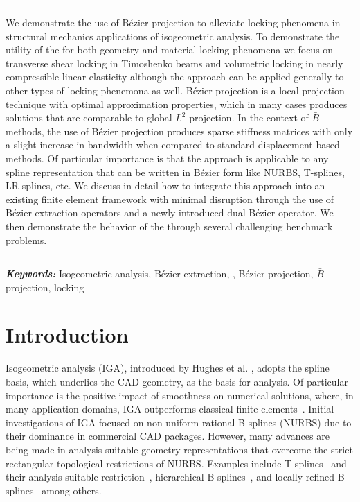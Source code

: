 \documentclass{article}
\newcommand{\Bezier}{{B\'{e}zier} }
\renewenvironment{abstract}{%
\hfill\begin{minipage}{0.95\textwidth}
\rule{\textwidth}{1pt}}
{\par\noindent\rule{\textwidth}{1pt}\end{minipage}}
\providecommand{\keywords}[1]{\textbf{\textit{Keywords: }}#1}
\begin{document}
\begin{abstract}
  We demonstrate the use of B\'{e}zier projection to alleviate locking phenomena in structural mechanics applications of isogeometric analysis.  To demonstrate the utility of the \replaced{\Bezier projection}{approach} for both geometry and material locking phenomena we focus on transverse shear locking in Timoshenko beams and volumetric locking in nearly compressible linear elasticity although the approach can be applied generally to other types of locking phenemona as well. B\'{e}zier projection is a local projection technique with optimal approximation properties, which in many cases produces solutions that are comparable to global $L^2$ projection. In the context of $\bar{B}$ methods, the use of B\'ezier projection produces sparse stiffness matrices with only a slight increase in bandwidth when compared to standard displacement-based methods. Of particular importance is that the approach is applicable to any spline representation that can be written in B\'ezier form like NURBS, T-splines, LR-splines, etc. We discuss in detail how to integrate this approach into an existing finite element framework with minimal disruption through the use of B\'ezier extraction operators and a newly introduced dual  \Bezier {} operator. We then demonstrate the behavior of the  through several challenging benchmark problems.
\end{abstract}
\keywords{Isogeometric analysis, B\'ezier extraction, \added{\Bezier dual basis}, B\'ezier projection, $\bar{B}$-projection, locking}
\section{Introduction}
Isogeometric analysis (IGA), introduced by Hughes et al. \cite{hughes_isogeometric_2005}, adopts the spline basis, which underlies the CAD geometry, as the basis for analysis. Of particular importance is the positive impact of smoothness on numerical solutions, where, in many application domains, IGA outperforms classical finite elements~\cite{cottrell_isogeometric_2009,cottrell_studies_2007,cottrell2006isogeometric,hughes_duality_2008,bazilevs_isogeometric_2010,evans_n-widths_2009}. Initial investigations of IGA focused on non-uniform rational B-splines (NURBS) due to their dominance in commercial CAD packages. However, many advances are being made in analysis-suitable geometry representations that overcome the strict rectangular topological restrictions of NURBS. Examples include T-splines~\cite{bazilevs_isogeometric_2010,sederberg_t-splines_2003} and their analysis-suitable restriction~\cite{scott_local_2012, li_analysis-suitable_2013}, hierarchical B-splines~\cite{bornemann_subdivision-based_2013,scott_isogeometric_2014,schillinger_isogeometric_2012,evans_hierarchical_2015,forsey_hierarchical_1988}, and locally refined B-splines~\cite{dokken_polynomial_2013,johannessen_isogeometric_2014} among others.
\end{document}
